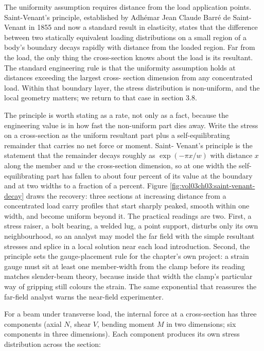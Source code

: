 The uniformity assumption requires distance from the load application
points. Saint-Venant's principle, established by Adh\'emar Jean
Claude Barr\'e de Saint-Venant in 1855 and now a standard result in
elasticity, states that the difference between two statically
equivalent loading distributions on a small region of a body's
boundary decays rapidly with distance from the loaded region. Far
from the load, the only thing the cross-section knows about the load
is its resultant. The standard engineering rule is that the
uniformity assumption holds at distances exceeding the largest cross-
section dimension from any concentrated load. Within that boundary
layer, the stress distribution is non-uniform, and the local geometry
matters; we return to that case in section 3.8.

The principle is worth stating as a rate, not only as a fact, because the
engineering value is in how fast the non-uniform part dies away. Write the
stress on a cross-section as the uniform resultant part plus a
self-equilibrating remainder that carries no net force or moment. Saint-
Venant's principle is the statement that the remainder decays roughly as
$\exp(-\pi x / w)$ with distance $x$ along the member and $w$ the
cross-section dimension, so at one width the self-equilibrating part has
fallen to about four percent of its value at the boundary and at two
widths to a fraction of a percent. Figure
\ref{fig:vol03ch03:saint-venant-decay} draws the recovery: three sections
at increasing distance from a concentrated load carry profiles that start
sharply peaked, smooth within one width, and become uniform beyond it. The
practical readings are two. First, a stress raiser, a bolt bearing, a
welded lug, a point support, disturbs only its own neighbourhood, so an
analyst may model the far field with the simple resultant stresses and
splice in a local solution near each load introduction. Second, the
principle sets the gauge-placement rule for the chapter's own project: a
strain gauge must sit at least one member-width from the clamp before its
reading matches slender-beam theory, because inside that width the clamp's
particular way of gripping still colours the strain. The same exponential
that reassures the far-field analyst warns the near-field experimenter.



For a beam under transverse load, the internal force at a cross-section
has three components (axial $N$, shear $V$, bending moment $M$ in two
dimensions; six components in three dimensions). Each component
produces its own stress distribution across the section:

